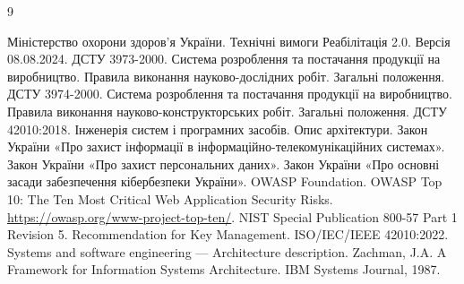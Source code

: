 \documentclass{article}
\begin{document}
\begin{thebibliography}{9}

 Міністерство охорони здоров’я України. \newblock Технічні вимоги Реабілітація 2.0. \newblock Версія 08.08.2024.
 ДСТУ 3973-2000. \newblock Система розроблення та постачання продукції на виробництво. Правила виконання науково-дослідних робіт. Загальні положення.
 ДСТУ 3974-2000. \newblock Система розроблення та постачання продукції на виробництво. Правила виконання науково-конструкторських робіт. Загальні положення.
 ДСТУ 42010:2018. \newblock Інженерія систем і програмних засобів. Опис архітектури.
 Закон України «Про захист інформації в інформаційно-телекомунікаційних системах».
 Закон України «Про захист персональних даних».
 Закон України «Про основні засади забезпечення кібербезпеки України».
 OWASP Foundation. \newblock OWASP Top 10: The Ten Most Critical Web Application Security Risks. \newblock \url{https://owasp.org/www-project-top-ten/}.
 NIST Special Publication 800-57 Part 1 Revision 5. \newblock Recommendation for Key Management.
 ISO/IEC/IEEE 42010:2022. \newblock Systems and software engineering — Architecture description.
 Zachman, J.A. \newblock A Framework for Information Systems Architecture. \newblock IBM Systems Journal, 1987.

\end{thebibliography}
\end{document}
